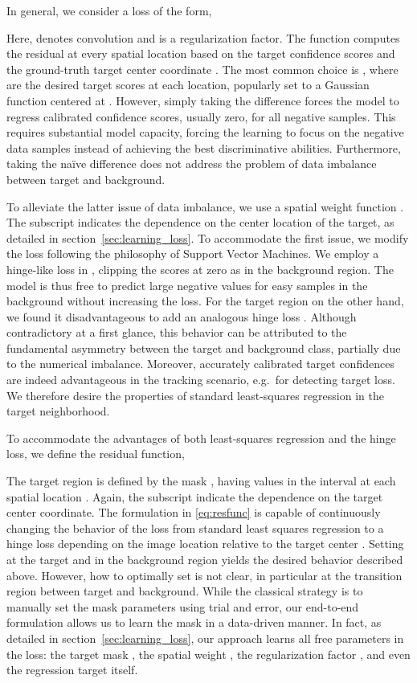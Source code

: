 \documentclass[10pt,twocolumn,letterpaper]{article}
\begin{document}
In general, we consider a loss of the form,

Here,  denotes convolution and  is a regularization factor. The function  computes the residual at every spatial location based on the target confidence scores  and the ground-truth target center coordinate . The most common choice is , where  are the desired target scores at each location, popularly set to a Gaussian function centered at  \cite{MOSSE2010}. However, simply taking the difference forces the model to regress calibrated confidence scores, usually zero, for all negative samples. This requires substantial model capacity, forcing the learning to focus on the negative data samples instead of achieving the best discriminative abilities. Furthermore, taking the na\"ive difference does not address the problem of data imbalance between target and background.

To alleviate the latter issue of data imbalance, we use a spatial weight function . The subscript  indicates the dependence on the center location of the target, as detailed in section~\ref{sec:learning_loss}. To accommodate the first issue, we modify the loss following the philosophy of Support Vector Machines. We employ a hinge-like loss in , clipping the scores at zero as  in the background region. The model is thus free to predict large negative values for easy samples in the background without increasing the loss. For the target region on the other hand, we found it disadvantageous to add an analogous hinge loss . Although contradictory at a first glance, this behavior can be attributed to the fundamental asymmetry between the target and background class, partially due to the numerical imbalance. Moreover, accurately calibrated target confidences are indeed advantageous in the tracking scenario, e.g.\ for detecting target loss. We therefore desire the properties of standard least-squares regression in the target neighborhood.

To accommodate the advantages of both least-squares regression and the hinge loss, we define the residual function,

The target region is defined by the mask , having values in the interval  at each spatial location . Again, the subscript  indicate the dependence on the target center coordinate. The formulation in \eqref{eq:resfunc} is capable of continuously changing the behavior of the loss from standard least squares regression to a hinge loss depending on the image location relative to the target center . Setting  at the target and  in the background region yields the desired behavior described above. However, how to optimally set  is not clear, in particular at the transition region between target and background. While the classical strategy is to manually set the mask parameters using trial and error, our end-to-end formulation allows us to learn the mask in a data-driven manner. In fact, as detailed in section~\ref{sec:learning_loss}, our approach learns all free parameters in the loss: the target mask , the spatial weight , the regularization factor , and even the regression target  itself.
\end{document}
